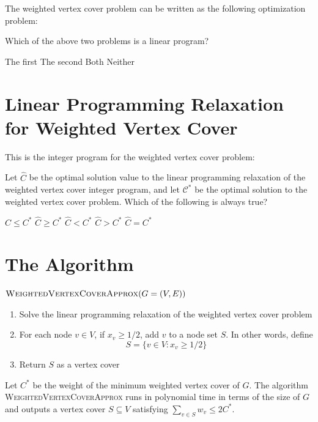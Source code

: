 \documentclass[11  pt]{article}
\begin{document}
\vfill

The weighted vertex cover problem can be written as the following optimization problem:
\vfill

\begin{Qu}
	Which of the above two problems is a linear program?
	\begin{itemize}
		\aitem The first
		\bitem The second
		\citem Both
		\ditem Neither
	\end{itemize}
\end{Qu}


\section{Linear Programming Relaxation for Weighted Vertex Cover}
This is the integer program for the weighted vertex cover problem:



\vfill

\begin{Qu}
	Let $\hat{C}$ be the optimal solution value to the linear programming relaxation of the weighted vertex cover integer program, and let $\mathcal{C}^*$ be the optimal solution to the weighted vertex cover problem. Which of the following is always true?
	\begin{itemize}
		\aitem $\hat{C} \leq C^*$
		\bitem $\hat{C} \geq C^*$
		\citem $\hat{C} < C^*$
		\ditem $\hat{C} > C^*$
		\eitem $\hat{C} = C^*$
	\end{itemize}
\end{Qu}

\newpage
\section{The Algorithm}
	$\textsc{WeightedVertexCoverApprox}(G = (V,E))$
\begin{enumerate}
	\item Solve the linear programming relaxation of the weighted vertex cover problem
	\item For each node $v \in V$, if $x_v \geq 1/2$, add $v$ to a node set $S$. In other words, define
	\begin{equation*}
		S = \{v \in V \colon x_v \geq 1/2\}
	\end{equation*}
	\item Return $S$ as a vertex cover
\end{enumerate}
\begin{theorem}
	Let $C^*$ be the weight of the minimum weighted vertex cover of $G$. The algorithm \textsc{WeightedVertexCoverApprox} runs in polynomial time in terms of the size of $G$ and outputs a vertex cover $S \subseteq V$ satisfying $\sum_{v \in S} w_v\leq 2C^*$. 
\end{theorem}
	
\end{document}
